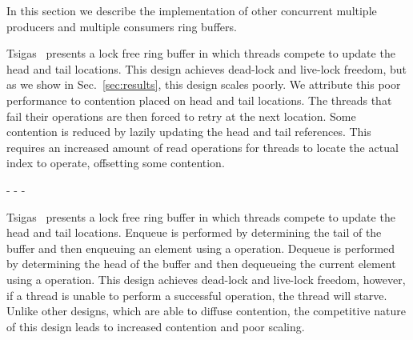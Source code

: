 
In this section we describe the implementation of other concurrent multiple producers and multiple consumers ring buffers.

Tsigas~\cite{tsigas_queue} presents a lock free ring buffer in which threads compete to update the head and tail locations.
This design achieves dead-lock and live-lock freedom, but as we show in Sec.~\ref{sec:results}, this design scales poorly.
We attribute this poor performance to contention placed on head and tail locations.
The threads that fail their  operations are then forced to retry at the next location.
Some contention is reduced by lazily updating the head and tail references.
This requires an increased amount of read operations for threads to locate the actual index to operate, offsetting some contention.

-%
-%
-%

Tsigas~\cite{tsigas_queue} presents a lock free ring buffer in which threads compete to update the head and tail locations.
Enqueue is performed by determining the tail of the buffer and then enqueuing an element using a  operation.
Dequeue is performed by determining the head of the buffer and then dequeueing the current element using a  operation. 
This design achieves dead-lock and live-lock freedom, however, if a thread is unable to perform a successful  operation, the thread will starve.
Unlike other designs, which are able to diffuse contention, the competitive nature of this design leads to increased contention and poor scaling.

